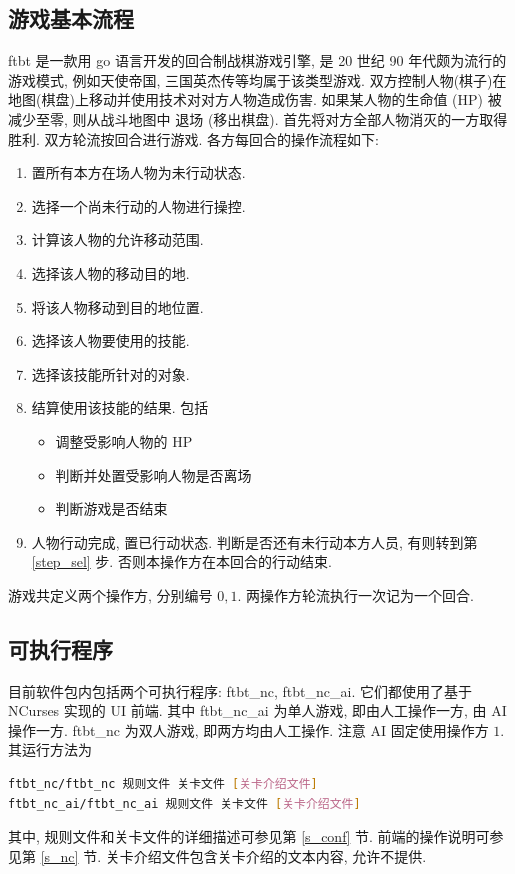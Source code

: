 \documentclass[UTF8, zihao=-4]{ctexart} %
\begin{document}
\subsection{游戏基本流程}
\label{s_intro}
ftbt 是一款用 go 语言开发的回合制战棋游戏引擎, 是 20 世纪 90 年代颇为流行的游戏模式, 例如天使帝国, 三国英杰传等均属于该类型游戏. 
双方控制人物(棋子)在地图(棋盘)上移动并使用技术对对方人物造成伤害. 如果某人物的生命值 (HP) 被减少至零, 则从战斗地图中
退场 (移出棋盘). 首先将对方全部人物消灭的一方取得胜利. 双方轮流按回合进行游戏. 各方每回合的操作流程如下: 
\begin{enumerate}
      \item 置所有本方在场人物为未行动状态.
      \item \label{step_sel}选择一个尚未行动的人物进行操控.
      \item 计算该人物的允许移动范围.
      \item \label{step_move}选择该人物的移动目的地.
      \item 将该人物移动到目的地位置.
      \item \label{step_tech}选择该人物要使用的技能.
      \item \label{step_obj}选择该技能所针对的对象.
      \item 结算使用该技能的结果. 包括
            \begin{itemize}
                  \item 调整受影响人物的 HP
                  \item 判断并处置受影响人物是否离场
                  \item 判断游戏是否结束
            \end{itemize}
      \item 人物行动完成, 置已行动状态. 判断是否还有未行动本方人员, 有则转到第 \ref{step_sel} 步. 否则本操作方在本回合的行动结束.
\end{enumerate}
游戏共定义两个操作方, 分别编号 $0, 1$. 两操作方轮流执行一次记为一个回合.

\subsection{可执行程序}
\label{s_exec}
目前软件包内包括两个可执行程序: ftbt\_nc, ftbt\_nc\_ai. 
它们都使用了基于 NCurses 实现的 UI 前端. 其中 ftbt\_nc\_ai 为单人游戏, 即由人工操作一方, 由 AI 操作一方.
ftbt\_nc 为双人游戏, 即两方均由人工操作. 注意 AI 固定使用操作方 $1$.
其运行方法为
\begin{lstlisting}[language=bash]
ftbt_nc/ftbt_nc 规则文件 关卡文件 [关卡介绍文件]
ftbt_nc_ai/ftbt_nc_ai 规则文件 关卡文件 [关卡介绍文件]
\end{lstlisting}
其中, 规则文件和关卡文件的详细描述可参见第 \ref{s_conf} 节. 前端的操作说明可参见第 \ref{s_nc} 节.
关卡介绍文件包含关卡介绍的文本内容, 允许不提供.
\end{document}
